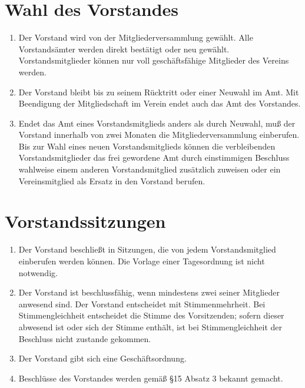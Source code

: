 \documentclass[ngerman]{scrartcl}
\begin{document}
\section{Wahl des Vorstandes} \label{sec:wahl_des_vorstandes}
\begin{enumerate}
 \item Der Vorstand wird von der Mitgliederversammlung gewählt.
 Alle Vorstandsämter werden direkt bestätigt oder neu gewählt.
 Vorstandsmitglieder können nur voll geschäftsfähige
 Mitglieder des Vereins werden.

 \item Der Vorstand bleibt bis zu seinem Rücktritt oder einer
 Neuwahl im Amt. Mit Beendigung der Mitgliedschaft im Verein
 endet auch das Amt des Vorstandes.

 \item Endet das Amt eines Vorstandsmitglieds anders als durch
 Neuwahl, muß der Vorstand innerhalb von zwei Monaten die
 Mitgliederversammlung einberufen. Bis zur Wahl eines neuen
 Vorstandsmitglieds können die verbleibenden
 Vorstandsmitglieder das frei gewordene Amt durch einstimmigen
 Beschluss wahlweise einem anderen Vorstandsmitglied
 zusätzlich zuweisen oder ein Vereinsmitglied als Ersatz in
 den Vorstand berufen.
\end{enumerate}
\section{Vorstandssitzungen} \label{sec:vorstandssitzungen}
\begin{enumerate}
 \item Der Vorstand beschließt in Sitzungen, die von jedem
 Vorstandsmitglied einberufen werden können. Die Vorlage einer
 Tagesordnung ist nicht notwendig.

 \item Der Vorstand ist beschlussfähig, wenn mindestens zwei
 seiner Mitglieder anwesend sind. Der Vorstand entscheidet mit
 Stimmenmehrheit. Bei Stimmengleichheit entscheidet die Stimme
 des Vorsitzenden; sofern dieser abwesend ist oder sich der
 Stimme enthält, ist bei Stimmengleichheit der Beschluss nicht
 zustande gekommen.

 \item Der Vorstand gibt sich eine Geschäftsordnung.
 \item Beschlüsse des Vorstandes werden gemäß §15 Absatz 3
 bekannt gemacht.
\end{enumerate}
\end{document}
